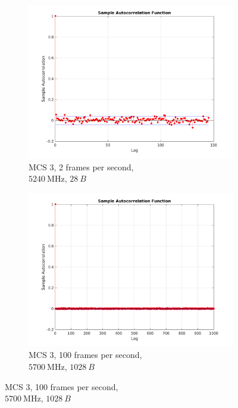 \documentclass[10pt,a4paper]{article}
\begin{document}
\begin{figure}
	\centering
	\begin{subfigure}[b]{0.45\textwidth}
		\includegraphics[width=\textwidth]{./fig/maes-1456822952-5240-2-3-modpc.png}
		\caption{MCS 3, 2 frames per second,\\ $\SI{5240}{\mega\hertz}$, $\SI{28}{B}$}\label{fig:acrpil:a}
	\end{subfigure}
	\begin{subfigure}[b]{0.45\textwidth}
		\includegraphics[width=\textwidth]{./fig/maes-1456906587-5700-100--1000pc.png}
		\caption{MCS 3, 100 frames per second,\\ $\SI{5700}{\mega\hertz}$, $\SI{1028}{B}$}\label{fig:acrpil:b}
	\end{subfigure}

\end{figure}
\end{document}

